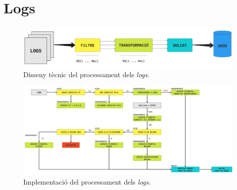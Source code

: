 \section{Logs}\label{sec:logs}

\begin{figure}[htbp]
    \centerline{\includegraphics[width=1.3\textwidth]{figures/log-processing}}
    \captionsetup{justification=centering}
    \caption{Disseny tècnic del processament dels \textit{logs}.}\label{fig:log-processing}
\end{figure}

\begin{figure}[htbp]
    \centerline{\includegraphics[width=1.5\textwidth]{figures/log-processing-workflow}}
    \captionsetup{justification=centering}
    \caption{Implementació del processament dels \textit{logs}.}\label{fig:log-processing-workflow}
\end{figure}
